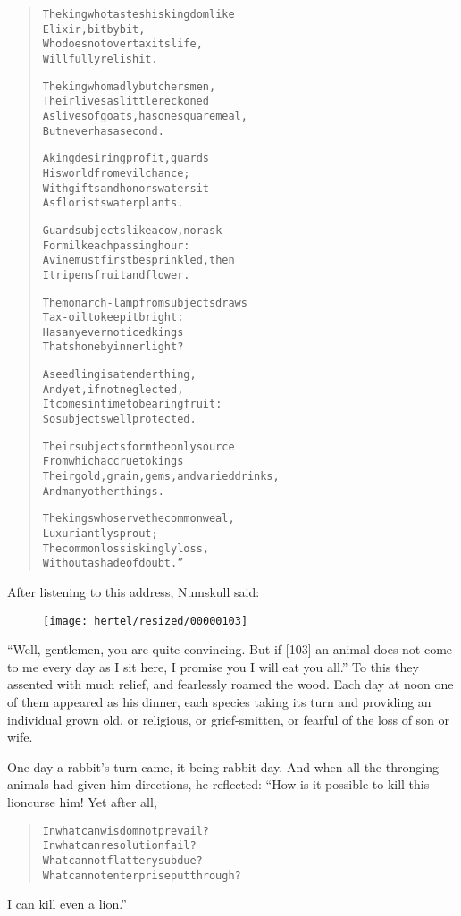 \documentclass[article, twoside, 10pt]{memoir}
\renewenvironment{verbatim}{%
\begin{quote}%
\vskip -10pt%
\begin{alltt}\normalfont\small}{\end{alltt}%
\end{quote}%
\vskip -10pt
} %
\begin{document}
\begin{verbatim}
The king who tastes his kingdom like
    Elixir, bit by bit,
Who does not overtax its life,
Will fully relish it.

The king who madly butchers men,
    Their lives as little reckoned
As lives of goats, has one square meal,
    But never has a second.

A king desiring profit, guards
    His world from evil chance;
With gifts and honors waters it
    As florists water plants.

Guard subjects like a cow, nor ask
    For milk each passing hour:
A vine must first be sprinkled, then
    It ripens fruit and flower.

The monarch-lamp from subjects draws
    Tax-oil to keep it bright:
Has any ever noticed kings
    That shone by inner light?

A seedling is a tender thing,
    And yet, if not neglected,
It comes in time to bearing fruit:
    So subjects well protected.

Their subjects form the only source
    From which accrue to kings
Their gold, grain, gems, and varied drinks,
    And many other things.

The kings who serve the common weal,
    Luxuriantly sprout;
The common loss is kingly loss,
    Without a shade of doubt.”
\end{verbatim}
After listening to this address, Numskull said:
\begin{figure}[p]\texttt{[image: hertel/resized/00000103]}\end{figure}``Well, gentlemen, you are quite convincing. But if [103] an animal does not come to me every day as I sit here, I promise you I will eat you all.''
To this they assented with much relief, and fearlessly roamed the
wood. Each day at noon one of them appeared as his dinner, each
species taking its turn and providing an individual grown old, or
religious, or grief-smitten, or fearful of the loss of son or
wife.

One day a rabbit's turn came, it being rabbit-day. And when all the
thronging animals had given him directions, he reflected: “How is
it possible to kill this lion{\textemdash}curse him! Yet after all,

\begin{verbatim}
In what can wisdom not prevail?
In what can resolution fail?
What cannot flattery subdue?
What cannot enterprise put through?
\end{verbatim}
I can kill even a lion.”
\end{document}
